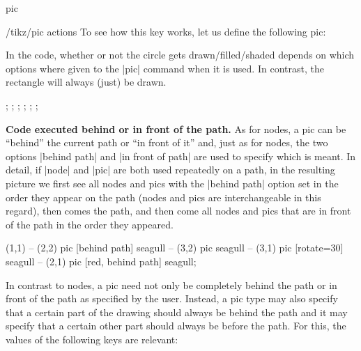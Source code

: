 \begin{pathoperation}{pic}
\begin{key}{/tikz/pic actions}
        To see how this key works, let us define the following pic:
\begin{codeexample}
\end{codeexample}
        In the code, whether or not the circle gets drawn/filled/shaded
        depends on which options where given to the |pic| command when it
        is used. In contrast, the rectangle will always (just) be drawn.
\begin{codeexample}[width=6cm]
\tikz {}; \space
\tikz {}; \space
\tikz {}; \space
\tikz {}; \space
\tikz {}; \space
\tikz {};
\end{codeexample}
    \end{key}

    \medskip
    \textbf{Code executed behind or in front of the path.}
    As for nodes, a pic can be ``behind'' the current path or ``in front of
    it'' and, just as for nodes, the two options |behind path| and
    |in front of path| are used to specify which is meant. In detail, if |node|
    and |pic| are both used repeatedly on a path, in the resulting picture we
    first see all nodes and pics with the |behind path| option set in the order
    they appear on the path (nodes and pics are interchangeable in this
    regard), then comes the path, and then come all nodes and pics that are in
    front of the path in the order they appeared.
\begin{codeexample}[]
\tikz \fill [fill=blue!20]
     (1,1)
  -- (2,2) pic [behind path]      {seagull}
  -- (3,2) pic                    {seagull}
  -- (3,1) pic [rotate=30]        {seagull}
  -- (2,1) pic [red, behind path] {seagull};
\end{codeexample}
    In contrast to nodes, a pic need not only be completely behind the path or
    in front of the path as specified by the user. Instead, a pic type may also
    specify that a certain part of the drawing should always be behind the path
    and it may specify that a certain other part should always be before the
    path. For this, the values of the following keys are relevant:


\end{pathoperation}
